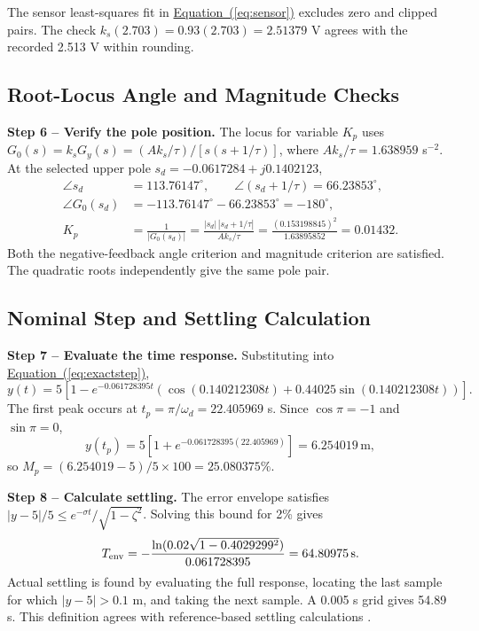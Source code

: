 \documentclass[12pt,a4paper]{article}
\providecommand{\ReportRoot}{../report/}
\numberwithin{equation}{section}
\newcommand{\page}{\clearpage}
\newcommand{\unit}[1]{\,\mathrm{#1}}
\newcommand{\Eref}[1]{\hyperref[#1]{Equation~(\ref*{#1})}}
\begin{document}
The sensor least-squares fit in \Eref{eq:sensor} excludes zero and clipped pairs. The check $k_s(2.703)=0.93(2.703)=2.51379$ V agrees with the recorded 2.513 V within rounding.
\page


\subsection{Root-Locus Angle and Magnitude Checks}
\textbf{Step 6 -- Verify the pole position.}
The locus for variable $K_p$ uses $G_0(s)=k_sG_y(s)=(Ak_s/\tau)/[s(s+1/\tau)]$, where $Ak_s/\tau=1.638959$ s$^{-2}$. At the selected upper pole $s_d=-0.0617284+j0.1402123$,
\begin{align}
\angle s_d&=113.76147^\circ,\qquad
\angle(s_d+1/\tau)=66.23853^\circ,\\
\angle G_0(s_d)&=-113.76147^\circ-66.23853^\circ=-180^\circ,\\
K_p&=\frac1{|G_0(s_d)|}
=\frac{|s_d|\,|s_d+1/\tau|}{Ak_s/\tau}
=\frac{(0.153198845)^2}{1.63895852}=0.01432.
\end{align}
Both the negative-feedback angle criterion and magnitude criterion are satisfied. The quadratic roots independently give the same pole pair.

\page
\subsection{Nominal Step and Settling Calculation}
\textbf{Step 7 -- Evaluate the time response.}
Substituting into \Eref{eq:exactstep},
\begin{equation}
y(t)=5\left[1-e^{-0.061728395t}
\left(\cos(0.140212308t)+0.44025\sin(0.140212308t)\right)\right].
\end{equation}
The first peak occurs at $t_p=\pi/\omega_d=22.405969$ s. Since $\cos\pi=-1$ and $\sin\pi=0$,
\begin{equation}
y(t_p)=5[1+e^{-0.061728395(22.405969)}]=6.254019\unit{m},
\end{equation}
so $M_p=(6.254019-5)/5\times100=25.080375\%$.

\textbf{Step 8 -- Calculate settling.} The error envelope satisfies $|y-5|/5\le e^{-\sigma t}/\sqrt{1-\zeta^2}$. Solving this bound for 2\% gives
\begin{equation}
T_{\rm env}=-\frac{\ln(0.02\sqrt{1-0.4029299^2})}{0.061728395}=64.80975\unit{s}.
\end{equation}
Actual settling is found by evaluating the full response, locating the last sample for which $|y-5|>0.1$ m, and taking the next sample. A 0.005 s grid gives 54.89 s. This definition agrees with reference-based settling calculations \cite{stepinfo}.
\end{document}
